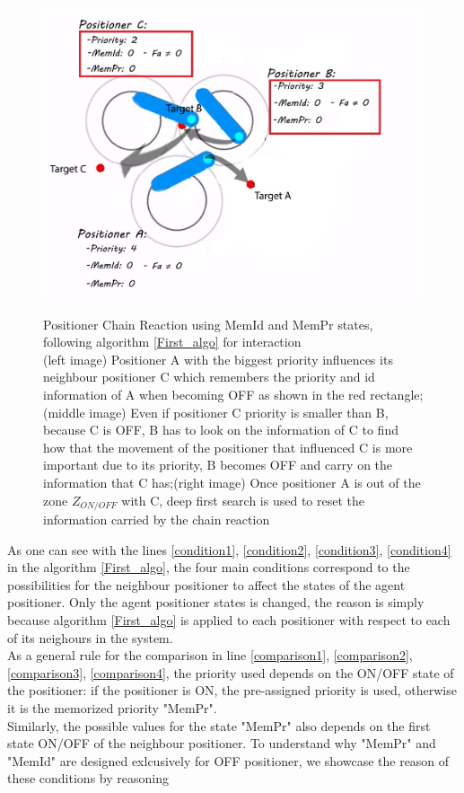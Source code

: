 \documentclass[]{spie}  %
\begin{document}
\begin{figure}[H]
\begin{minipage}[t]{5.4cm}
 			\includegraphics[scale=0.3]{images/ID_PR2.jpg}
 			\label{ID_PR2}
 		\end{minipage}
 		\caption{\centering Positioner Chain Reaction using MemId and MemPr states, following algorithm \ref{First_algo} for interaction\\
 			(left image) Positioner A with the biggest priority influences its neighbour positioner C which remembers the priority and id information of A when becoming OFF as shown in the red rectangle; (middle image) Even if positioner C priority is smaller than B, because C is OFF, B has to look on the information of C to find how that the movement of the positioner that influenced C is more important due to its priority, B becomes OFF and carry on the information that C has;(right image) Once positioner A is out of the zone $Z_{ON/OFF}$ with C, deep first search is used to reset the information carried by the chain reaction }
 		\label{ID_PR}
 	\end{figure}
	 As one can see with the lines \ref{condition1}, \ref{condition2}, \ref{condition3}, \ref{condition4} in the algorithm \ref{First_algo}, the four main conditions correspond to the possibilities for the neighbour positioner to affect the states of the agent positioner. Only the agent positioner states is changed, the reason is simply because algorithm \ref{First_algo} is applied to each positioner with respect to each of its neighours in the system.\\
	As a general rule for the comparison in line \ref{comparison1}, \ref{comparison2}, \ref{comparison3}, \ref{comparison4}, the priority used depends on the ON/OFF state of the positioner: if the positioner is ON, the pre-assigned priority is used, otherwise it is the memorized priority "MemPr". \\
	Similarly, the possible values for the state "MemPr" also depends on the first state ON/OFF of the neighbour positioner. 	
	To understand why "MemPr" and "MemId" are designed exlcusively for OFF positioner, we showcase the reason of these conditions by reasoning 
	
\end{document}
